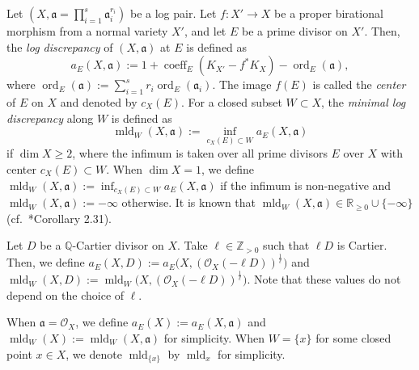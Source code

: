 \documentclass[a4paper,11pt]{amsart}
\theoremstyle{definition}
\theoremstyle{remark}
\begin{document}
Let $(X, \mathfrak{a} = \prod _{i = 1} ^s \mathfrak{a}_i ^{r_i})$ be a log pair. 
Let $f: X' \to X$ be a proper birational morphism from a normal variety $X'$, and let $E$ be a prime divisor on $X'$.  
Then, the \textit{log discrepancy} of $(X, \mathfrak{a})$ at $E$ is defined as 
\[
a_E(X, \mathfrak{a}) := 1 + \operatorname{coeff}_E (K_{X'} - f^* K_X) - \operatorname{ord}_E ( \mathfrak{a} ), 
\]
where $\operatorname{ord}_E ( \mathfrak{a} ) := \sum _{i=1} ^s r_i \operatorname{ord}_E ( \mathfrak{a}_i )$. 
The image $f(E)$ is called the \textit{center} of $E$ on $X$ and denoted by $c_X(E)$. 
For a closed subset $W \subset X$, the \textit{minimal log discrepancy} along $W$ is defined as 
\[
\operatorname{mld}_W (X, \mathfrak{a}) := \inf _{c_X(E) \subset W} a_E (X, \mathfrak{a})
\]
if $\dim X \ge 2$, where the infimum is taken over all prime divisors $E$ over $X$ with center $c_X(E) \subset W$. 
When $\dim X = 1$, we define $\operatorname{mld}_W (X, \mathfrak{a}) := \inf _{c_X(E) \subset W} a_E (X, \mathfrak{a})$ 
if the infimum is non-negative and 
$\operatorname{mld}_W (X, \mathfrak{a}) := - \infty$ otherwise. 
It is known that $\operatorname{mld}_W (X, \mathfrak{a}) \in \mathbb{R}_{\ge 0} \cup \{ - \infty \}$ (cf.\ \cite{KM98}*{Corollary 2.31}). 

Let $D$ be a $\mathbb{Q}$-Cartier divisor on $X$. 
Take $\ell \in \mathbb{Z} _{>0}$ such that $\ell D$ is Cartier. 
Then, we define $a_E (X, D) := a_E \bigl( X, (\mathcal{O}_X(- \ell D)) ^{\frac{1}{\ell}} \bigr)$ and $\operatorname{mld}_W (X, D) := \operatorname{mld}_W \bigl( X, (\mathcal{O}_X(- \ell D)) ^{\frac{1}{\ell}} \bigr)$. 
Note that these values do not depend on the choice of $\ell$. 


When $\mathfrak{a} = \mathcal{O}_X$, we define $a_E (X) := a_E (X, \mathfrak{a})$ and $\operatorname{mld}_W (X) := \operatorname{mld}_W (X, \mathfrak{a})$ for simplicity. 
When $W = \{ x \}$ for some closed point $x \in X$, 
we denote $\operatorname{mld}_{\{ x \}}$ by $\operatorname{mld}_x$ for simplicity. 
\end{document}

